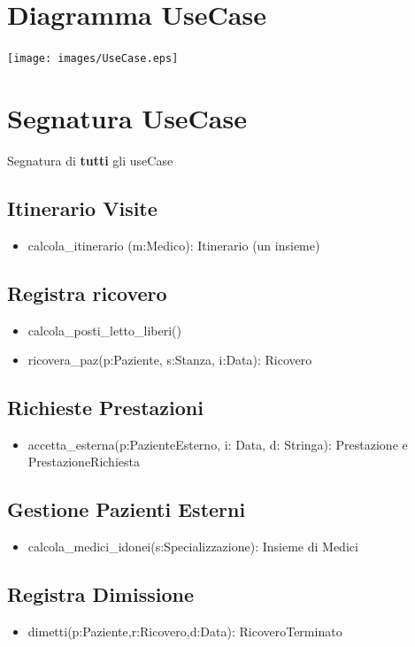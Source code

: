 \documentclass[12pt, letterpaper]{article}
\begin{document}
\section{Diagramma UseCase}
\begin{center}
    \texttt{[image: images/UseCase.eps]}
\end{center}\newpage
\section{Segnatura UseCase}
Segnatura di \textbf{tutti} gli useCase\\
\subsection{Itinerario Visite}
\begin{itemize}
    \item calcola\_itinerario (m:Medico): Itinerario (un insieme)
\end{itemize}
\subsection{Registra ricovero}
\begin{itemize}
    \item calcola\_posti\_letto\_liberi()
    \item ricovera\_paz(p:Paziente, s:Stanza, i:Data): Ricovero
\end{itemize}

\subsection{Richieste Prestazioni}
\begin{itemize}
    \item accetta\_esterna(p:PazienteEsterno, i: Data, d: Stringa): Prestazione e PrestazioneRichiesta
\end{itemize}
\subsection{Gestione Pazienti Esterni}
\begin{itemize}
    \item calcola\_medici\_idonei(s:Specializzazione): Insieme di Medici
\end{itemize}
\subsection{Registra Dimissione}
\begin{itemize}
    \item dimetti(p:Paziente,r:Ricovero,d:Data): RicoveroTerminato
\end{itemize}
\newpage
\end{document}
